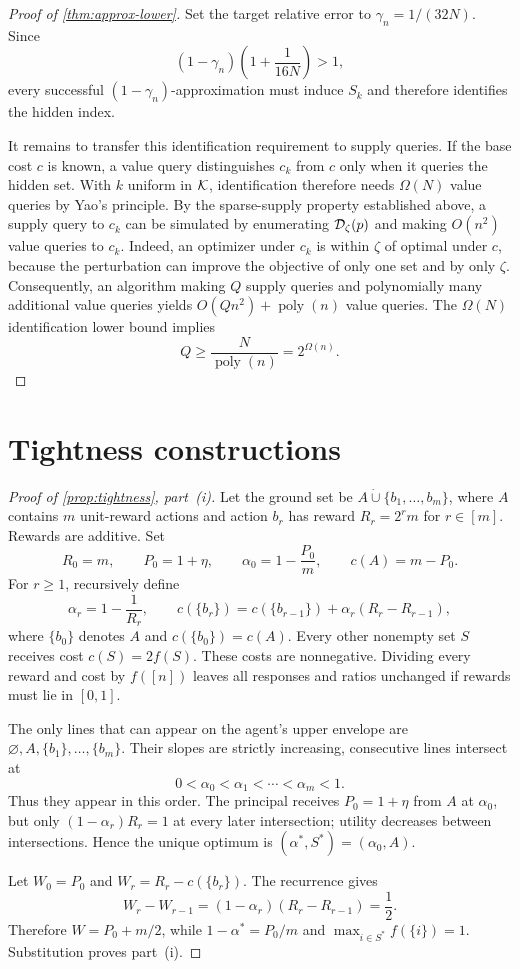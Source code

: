 \documentclass[11pt]{article}
\begin{document}
\begin{proof}[Proof of \cref{thm:approx-lower}]
Set the target relative error to $\gamma_n=1/(32N)$.  Since
\[
 (1-\gamma_n)\left(1+\frac1{16N}\right)>1,
\]
every successful $(1-\gamma_n)$-approximation must induce $S_k$ and
therefore identifies the hidden index.

It remains to transfer this identification requirement to supply queries.
If the base cost $c$ is known, a value query distinguishes $c_k$ from $c$
only when it queries the hidden set.  With $k$ uniform in ${\cal K}$,
identification therefore needs $\Omega(N)$ value queries by Yao's
principle.  By the sparse-supply property established above, a supply query
to $c_k$ can be simulated by enumerating ${\cal D}_\zeta(p)$ and making
$O(n^2)$ value queries to $c_k$.  Indeed, an optimizer under $c_k$ is within
$\zeta$ of optimal under $c$, because the perturbation can improve the
objective of only one set and by only $\zeta$.  Consequently, an algorithm
making $Q$ supply
queries and polynomially many additional value queries yields
$O(Qn^2)+\operatorname{poly}(n)$ value queries.  The $\Omega(N)$
identification lower bound implies
\[
                    Q\geq\frac{N}{\operatorname{poly}(n)}
                     =2^{\Omega(n)}.
\]
\end{proof}

\clearpage
\small
\section{Tightness constructions}\label{app:tightness}

\begin{proof}[Proof of \cref{prop:tightness}, part~(i)]
Let the ground set be
$A\mathbin{\dot\cup}\{b_1,\ldots,b_m\}$, where $A$ contains $m$
unit-reward actions and action $b_r$ has reward $R_r=2^rm$ for $r\in[m]$.
Rewards are additive.
Set
\[
 R_0=m,\qquad P_0=1+\eta,\qquad
 \alpha_0=1-\frac{P_0}{m},\qquad c(A)=m-P_0.
\]
For $r\geq1$, recursively define
\[
\alpha_r=1-\frac1{R_r},
\qquad
c(\{b_r\})=c(\{b_{r-1}\})
  +\alpha_r(R_r-R_{r-1}),
\]
where $\{b_0\}$ denotes $A$ and $c(\{b_0\})=c(A)$.
Every other nonempty set $S$ receives cost $c(S)=2f(S)$.
These costs are nonnegative.  Dividing every reward and cost by $f([n])$
leaves all responses and ratios unchanged if rewards must lie in $[0,1]$.

The only lines that can appear on the agent's upper envelope are
$\varnothing,A,\{b_1\},\ldots,\{b_m\}$.  Their slopes are strictly
increasing, consecutive lines intersect at
\[
0<\alpha_0<\alpha_1<\cdots<\alpha_m<1.
\]
Thus they appear in this order.  The principal receives $P_0=1+\eta$ from
$A$ at $\alpha_0$, but only $(1-\alpha_r)R_r=1$ at every later
intersection; utility decreases between intersections.  Hence the unique
optimum is $(\alpha^*,S^*)=(\alpha_0,A)$.

Let $W_0=P_0$ and $W_r=R_r-c(\{b_r\})$.  The recurrence gives
\[
W_r-W_{r-1}
=(1-\alpha_r)(R_r-R_{r-1})
 =\frac12.
\]
Therefore $W=P_0+m/2$, while $1-\alpha^*=P_0/m$ and
$\max_{i\in S^*}f(\{i\})=1$.  Substitution proves part~(i).
\end{proof}
\end{document}
